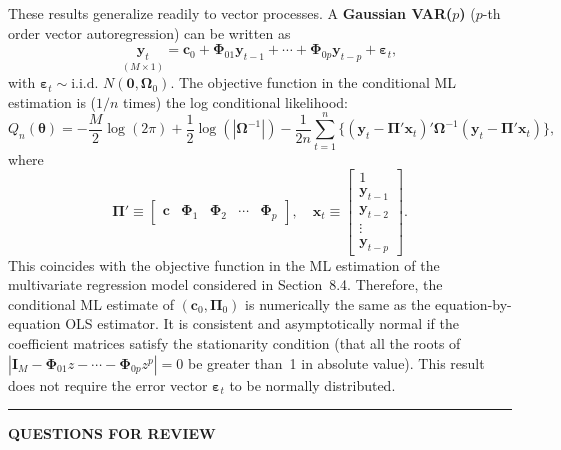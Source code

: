 These results generalize readily to vector processes. A \textbf{Gaussian VAR($p$)}
($p$-th order vector autoregression) can be written as
\begin{equation}
  \underset{(M \times 1)}{\mathbf{y}_t}
  = \mathbf{c}_0 + \boldsymbol{\Phi}_{01}\mathbf{y}_{t-1}
  + \cdots + \boldsymbol{\Phi}_{0p}\mathbf{y}_{t-p}
  + \boldsymbol{\varepsilon}_t,
  \label{eq:8.7.21} \tag{8.7.21}
\end{equation}
with $\boldsymbol{\varepsilon}_t \sim \text{i.i.d.\ } N(\mathbf{0}, \boldsymbol{\Omega}_0)$.
The objective function in the conditional ML estimation
is ($1/n$ times) the log conditional likelihood:
\begin{equation}
  Q_n(\boldsymbol{\theta})
  = -\frac{M}{2}\log(2\pi)
    + \frac{1}{2}\log(|\boldsymbol{\Omega}^{-1}|)
    - \frac{1}{2n}\sum_{t=1}^{n}
      \{(\mathbf{y}_t - \boldsymbol{\Pi}'\mathbf{x}_t)'
      \boldsymbol{\Omega}^{-1}
      (\mathbf{y}_t - \boldsymbol{\Pi}'\mathbf{x}_t)\},
  \label{eq:8.7.22} \tag{8.7.22}
\end{equation}
where
\begin{equation}
  \boldsymbol{\Pi}' \equiv
  \begin{bmatrix}
    \mathbf{c} & \boldsymbol{\Phi}_1 & \boldsymbol{\Phi}_2 & \cdots & \boldsymbol{\Phi}_p
  \end{bmatrix}, \quad
  \mathbf{x}_t \equiv
  \begin{bmatrix} 1 \\ \mathbf{y}_{t-1} \\ \mathbf{y}_{t-2} \\ \vdots \\ \mathbf{y}_{t-p} \end{bmatrix}.
  \label{eq:8.7.23} \tag{8.7.23}
\end{equation}
This coincides with the objective function in the ML estimation of the multivariate regression model considered in Section~8.4. Therefore, the conditional ML
estimate of $(\mathbf{c}_0, \boldsymbol{\Pi}_0)$ is numerically the same as the equation-by-equation OLS estimator. It is consistent and asymptotically normal if the coefficient matrices satisfy
the stationarity condition (that all the roots of
$|\mathbf{I}_M - \boldsymbol{\Phi}_{01}z - \cdots - \boldsymbol{\Phi}_{0p}z^p| = 0$ be
greater than~1 in absolute value). This result does not require the error vector $\boldsymbol{\varepsilon}_t$ to
be normally distributed.

\bigskip
\noindent\rule{\textwidth}{0.4pt}
\textbf{QUESTIONS FOR REVIEW}
\medskip

